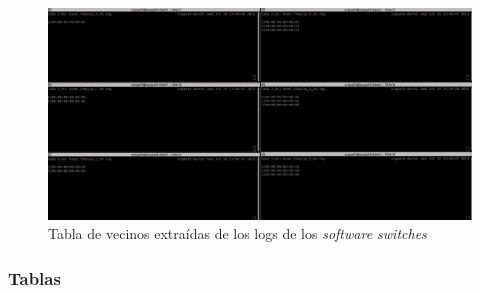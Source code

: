 \begin{figure}
    \begin{center}
        \includegraphics[width=\textwidth]{archivos/img/dev/nb_real.png}
        \caption{Tabla de vecinos extraídas de los logs de los \textit{software switches}}
        \label{fig:nb_real}
    \end{center}
\end{figure}

\newpage


\subsubsection{Tablas }

